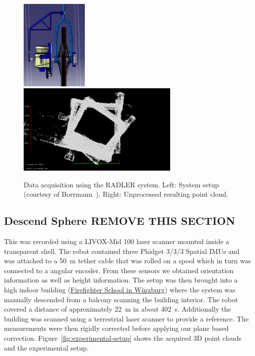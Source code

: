 	\begin{figure}
		\centering
		\begin{minipage}[c]{\textwidth}
			\includegraphics[width=0.2925\textwidth]{./images/radler_setup}\hfill
			\includegraphics[width=0.7\textwidth]{./images/mathe_top_view}
		\end{minipage}
		\caption{Data acquisition using the RADLER system. Left: System setup (courtesy of Borrmann~\cite{Borrmann2020-RADLER}). Right: Unprocessed resulting point cloud.}
		\label{fig:radler-mathe}
	\end{figure}

	\subsection{Descend Sphere REMOVE THIS SECTION}

	This was recorded using a LIVOX-Mid 100 laser scanner mounted inside a transparent shell. 
	The robot contained three Phidget 3/3/3 Spatial IMUs and was attached to a \SI{50}{\meter} tether cable that was rolled on a spool which in turn was connected to a angular encoder. 
	From these sensors we obtained orientation information as well as height information. 
	The setup was then brought into a high indoor building (\href{https://www.sfs-w.de/feuerwehrschule/virtueller-rundgang.html}{Firefighter School in Würzburg}) where the system was manually descended from a balcony scanning the building interior.
	The robot covered a distance of approximately \SI{22}{\meter} in about \SI{402}{\second}.
	Additionally the building was scanned using a terrestrial laser scanner to provide a reference.
	The measurements were then rigidly corrected before applying our plane based correction. 
	Figure~\ref{fig:experimental-setup} shows the acquired 3D point clouds and the experimental setup. 

